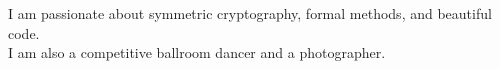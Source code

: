 \vspace{0.5cm}
\begin{center}
	\setlength\tabcolsep{0pt}
	\setlength{\extrarowheight}{0pt}
	\small
	\color{darkgray}
	I am passionate about symmetric cryptography, formal methods, and beautiful code.\\
	I am also a competitive ballroom dancer and a photographer.
\end{center}
